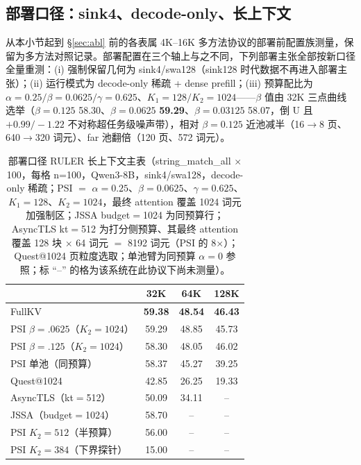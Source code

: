 \documentclass[11pt]{article}
\begin{document}
\subsection{部署口径：sink4、decode-only、长上下文}\label{sec:caliber}

从本小节起到 \S\ref{sec:abl} 前的各表属 4K--16K 多方法协议的部署前配置族测量，保留为多方法对照记录。部署配置在三个轴上与之不同，下列部署主张全部按新口径全量重测：(i) 强制保留几何为 sink4/swa128（sink128 时代数据不再进入部署主张）；(ii) 运行模式为 decode-only 稀疏 + dense prefill；(iii) 预算配比为 $\alpha{=}0.25/\beta{=}0.0625/\gamma{=}0.625$、$K_1{=}128/K_2{=}1024$——$\beta$ 值由 32K 三点曲线选举（$\beta{=}0.125$ 58.30、$\beta{=}0.0625$ \textbf{59.29}、$\beta{=}0.03125$ 58.07，倒 U 且 $+0.99/-1.22$ 不对称超任务级噪声带），相对 $\beta{=}0.125$ 近池减半（16$\to$8 页、640$\to$320 词元）、far 池翻倍（120 页、572 词元）。

\begin{table}[h]\centering
\caption{部署口径 RULER 长上下文主表（string\_match\_all $\times$100，每格 n=100，Qwen3-8B，sink4/swa128，decode-only 稀疏；PSI $=$ $\alpha{=}0.25$、$\beta{=}0.0625$、$\gamma{=}0.625$、$K_1{=}128$、$K_2{=}1024$，最终 attention 覆盖 1024 词元加强制区；JSSA budget$=$1024 为同预算行；AsyncTLS kt$=$512 为打分侧预算、其最终 attention 覆盖 128 块 $\times$ 64 词元 $=$ 8192 词元（PSI 的 8$\times$）；Quest@1024 页粒度选取；单池臂为同预算 $\alpha{=}0$ 参照；标 ``--'' 的格为该系统在此协议下尚未测量）。}
\label{tab:rulerlong}
\begin{tabular}{lccc}
\toprule
 & 32K & 64K & 128K \\
\midrule
FullKV & \textbf{59.38} & \textbf{48.54} & \textbf{46.43} \\
PSI $\beta{=}.0625$（$K_2{=}1024$） & 59.29 & 48.85 & 45.73 \\
PSI $\beta{=}.125$（$K_2{=}1024$） & 58.30 & 48.05 & 46.02 \\
PSI 单池（同预算） & 58.37 & 45.27 & 39.25 \\
\addlinespace
Quest@1024 & 42.85 & 26.25 & 19.33 \\
AsyncTLS（kt$=$512） & 50.09 & 34.11 & -- \\
JSSA（budget$=$1024） & 58.70 & -- & -- \\
\addlinespace
PSI $K_2{=}512$（半预算） & 56.00 & -- & -- \\
PSI $K_2{=}384$（下界探针） & 15.00 & -- & -- \\
\bottomrule
\end{tabular}
\end{table}
\end{document}
